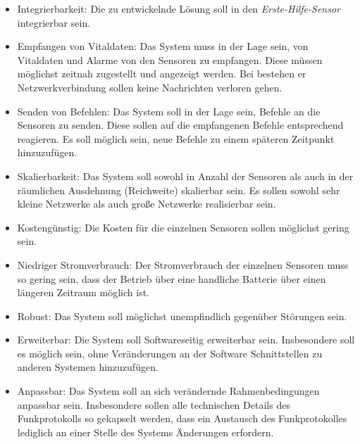     \begin{itemize}
        \item{Integrierbarkeit:} Die zu entwickelnde Lösung soll in den \emph{Erste-Hilfe-Sensor}
                                 integrierbar sein.
        \item{Empfangen von Vitaldaten:} Das System muss in der Lage sein, von Vitaldaten und Alarme  
                                         von den Sensoren zu empfangen. Diese müssen möglichst zeitnah
                                         zugestellt und angezeigt werden. Bei bestehen er Netzwerkverbindung
                                         sollen keine Nachrichten verloren gehen. 
        \item{Senden von Befehlen:} Das System soll in der Lage sein, Befehle an die Sensoren zu senden.
                                    Diese sollen auf die empfangenen Befehle entsprechend reagieren. Es
                                    soll möglich sein, neue Befehle zu einem späteren Zeitpunkt hinzuzufügen.
        \item{Skalierbarkeit:} Das System soll sowohl in Anzahl der Sensoren als auch in der räumlichen 
                               Ausdehnung (Reichweite) skalierbar sein. Es sollen sowohl sehr kleine Netzwerke
                               als auch große Netzwerke realisierbar sein.
        \item{Kostengünstig:} Die Kosten für die einzelnen Sensoren sollen möglichst gering sein.
        \item{Niedriger Stromverbrauch:} Der Stromverbrauch der einzelnen Sensoren muss so gering sein, dass
                                         der Betrieb über eine handliche Batterie über einen längeren 
                                         Zeitraum möglich ist.
        \item{Robust:} Das System soll möglichst unempfindlich gegenüber Störungen sein.
        \item{Erweiterbar:} Die System soll Softwareseitig erweiterbar sein. Insbesondere soll es 
                            möglich sein, ohne Veränderungen an der Software Schnittstellen
                            zu anderen Systemen hinzuzufügen. 
        \item{Anpassbar:} Das System soll an sich verändernde Rahmenbedingungen anpassbar sein. Insbesondere
                          sollen alle technischen Details des Funkprotokolls so gekapselt werden, dass ein
                          Austausch des Funkprotokolles lediglich an einer Stelle des Systems Änderungen
                          erfordern.
    \end{itemize}

